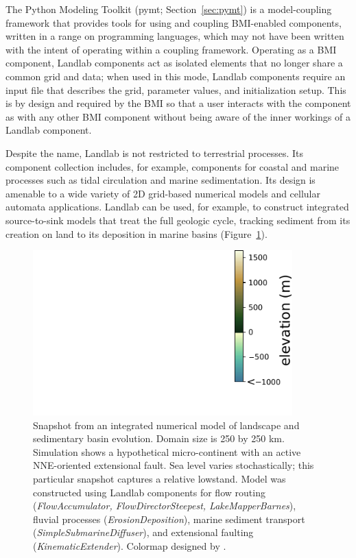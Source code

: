 \documentclass{article} %
\begin{document}
The Python Modeling Toolkit (pymt; Section~\ref{sec:pymt})
is a model-coupling framework that provides tools for using and coupling BMI-enabled components,
written in a range on programming languages, which may not have been written with the intent
of operating within a coupling framework.
Operating as a BMI component, Landlab components act as isolated elements that no longer
share a common grid and data; when used in this mode, Landlab components require an input file that describes the grid, parameter values, and
initialization setup. This is by design and required by the BMI so that a user interacts
with the component as with any other BMI component without being aware of the inner workings
of a Landlab component.


Despite the name, Landlab is not restricted to terrestrial processes. Its component collection includes, for example, components for coastal and marine processes such as tidal circulation and marine sedimentation. Its design is amenable to a wide variety of 2D grid-based numerical models and cellular automata applications. Landlab can be used, for example, to construct integrated source-to-sink models that treat the full geologic cycle, tracking sediment from its creation on land to its deposition in marine basins (Figure~\ref{fig:riftisland}).

\begin{figure}
\includegraphics[width=10cm]{Figures/rift_island.pdf}
\caption{Snapshot from an integrated numerical model of landscape and sedimentary basin evolution. Domain size is 250 by 250 km. Simulation shows a hypothetical micro-continent with an active NNE-oriented extensional fault. Sea level varies stochastically; this particular snapshot captures a relative lowstand. Model was constructed using Landlab components for flow routing (\textit{FlowAccumulator, FlowDirectorSteepest, LakeMapperBarnes}), fluvial processes (\textit{ErosionDeposition}), marine sediment transport (\textit{SimpleSubmarineDiffuser}), and extensional faulting (\textit{KinematicExtender}). Colormap designed by \citet{thyng2016true}.}
\label{fig:riftisland}
\end{figure}
\end{document}
